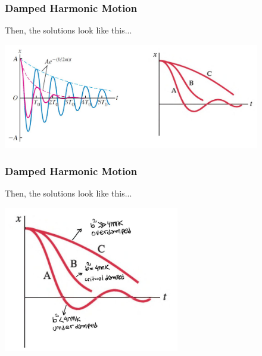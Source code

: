\documentclass[]{beamer}
\begin{document}

\begin{frame}
\frametitle{Damped Harmonic Motion}


Then, the solutions look like this...

\pause
  \begin{center}
  \includegraphics[height=1.8in]{images3/dampling3.jpg}
\end{center}




\end{frame}



\begin{frame}
\frametitle{Damped Harmonic Motion}

Then, the solutions look like this...


  \begin{center}
  \includegraphics[height=2.5in]{images3/dampling2b.jpg}
\end{center}




\end{frame}

\end{document}
